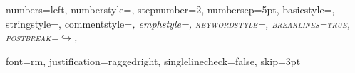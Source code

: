  \usepackage{enumitem}


\usepackage[final]{listings}
\lstset
{
numbers=left, numberstyle=\tiny\rmfamily, stepnumber=2, numbersep=5pt,
basicstyle=\ttfamily,
stringstyle=\ttfamily,
commentstyle=\itshape,
emphstyle=\scshape,
keywordstyle=\scshape,
breaklines=true,
postbreak=\mbox{$\hookrightarrow$\enspace},
}
\usepackage{caption}
\captionsetup
{
font={rm},
justification=raggedright,
singlelinecheck=false,
skip=3pt
}



\pagestyle{headings}

\usepackage[thmmarks]{ntheorem}
\theoremstyle{plain}
\theorempreskip{\medskipamount}
\theorempostskip{\medskipamount}
\theorembodyfont{\upshape}
{
\theoremheaderfont{\itshape}
\newtheorem{definition}{Definición}
}
{
\theoremheaderfont{\scshape}
\newtheorem{theorem}{Teorema}
}
